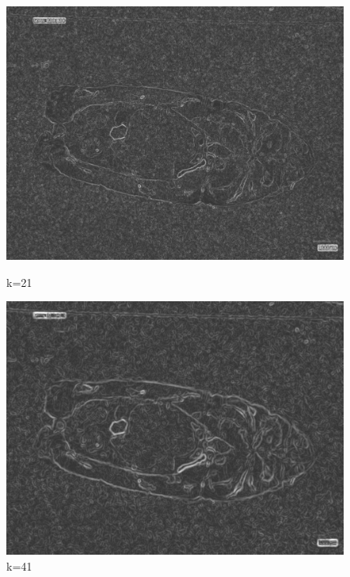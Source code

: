 \begin{figure}
    \centering
    \begin{minipage}{0.24\textwidth}
        \centering
        \includegraphics[width=\textwidth]{./fig/gausssian/sobel21.jpg}
        \caption*{k=21}
    \end{minipage}
    \begin{minipage}{0.24\textwidth}
        \centering
        \includegraphics[width=\textwidth]{./fig/gausssian/sobel41.jpg}
        \caption*{k=41}
    \end{minipage}
    \begin{minipage}{0.24\textwidth}
        \centering

\end{minipage}
\end{figure}

